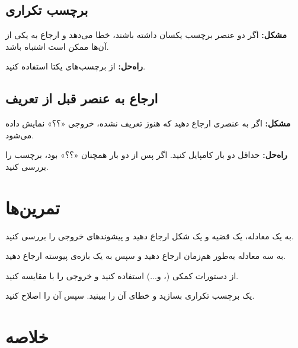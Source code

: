\subsection{برچسب تکراری}
\label{sec:cross-refs-mistake-duplicate}

\textbf{مشکل:} اگر دو عنصر برچسب یکسان داشته
باشند،  خطا می‌دهد و ارجاع به یکی
از آن‌ها ممکن است اشتباه باشد.

\textbf{راه‌حل:} از برچسب‌های یکتا استفاده
کنید.

\subsection{ارجاع به عنصر قبل از تعریف}
\label{sec:cross-refs-mistake-forward}

\textbf{مشکل:} اگر به عنصری ارجاع دهید که
هنوز تعریف نشده، خروجی «؟؟» نمایش داده
می‌شود.

\textbf{راه‌حل:} حداقل دو بار کامپایل کنید.
اگر پس از دو بار همچنان «؟؟» بود، برچسب
را بررسی کنید.


\section{تمرین‌ها}
\label{sec:cross-refs-exercises}

\begin{exercise}
    به یک معادله، یک قضیه و یک شکل ارجاع
    دهید و پیشوندهای خروجی را بررسی کنید.
    \label{exc:cross-refs-basic}
\end{exercise}

\begin{exercise}
    به سه معادله به‌طور هم‌زمان ارجاع دهید
    و سپس به یک بازه‌ی پیوسته ارجاع دهید.
    \label{exc:cross-refs-multiple}
\end{exercise}

\begin{exercise}
    از دستورات کمکی (،
     و...) استفاده کنید و خروجی
    را با  مقایسه کنید.
    \label{exc:cross-refs-helpers}
\end{exercise}

\begin{exercise}
    یک برچسب تکراری بسازید و خطای آن را
    ببینید. سپس آن را اصلاح کنید.
    \label{exc:cross-refs-duplicate}
\end{exercise}

\section{خلاصه}
\label{sec:cross-refs-summary}

